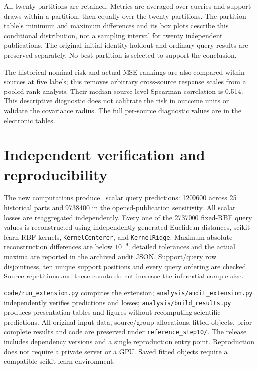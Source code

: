 All twenty partitions are retained. Metrics are averaged over queries and support draws within a partition, then equally over the twenty partitions. The partition table's minimum and maximum differences and its box plots describe this conditional distribution, not a sampling interval for twenty independent publications. The original initial identity holdout and ordinary-query results are preserved separately. No best partition is selected to support the conclusion.

\begin{table}[htbp]\centering\small
\caption{Twenty additional identity-disjoint partitions at five labels, using the same fixed historical-selected RBF. MAE and differences from matched random acquisition are in percentage points.}
\end{table}


The historical nominal risk and actual MSE rankings are also compared within sources at five labels; this removes arbitrary cross-source response scales from a pooled rank analysis. Their median source-level Spearman correlation is 0.514. This descriptive diagnostic does not calibrate the risk in outcome units or validate the covariance radius. The full per-source diagnostic values are in the electronic tables.

\section{Independent verification and reproducibility}
The new computations produce \NewScalarCount\ scalar query predictions: 1209600 across 25 historical parts and 9738400 in the opened-publication sensitivity. All scalar losses are reaggregated independently. Every one of the 2737000 fixed-RBF query values is reconstructed using independently generated Euclidean distances, scikit-learn RBF kernels, \texttt{KernelCenterer}, and \texttt{KernelRidge}. Maximum absolute reconstruction differences are below $10^{-9}$; detailed tolerances and the actual maxima are reported in the archived audit JSON. Support/query row disjointness, ten unique support positions and every query ordering are checked. Source repetitions and these counts do not increase the inferential sample size.

\texttt{code/run\_extension.py} computes the extension; \texttt{analysis/audit\_extension.py} independently verifies predictions and losses; \texttt{analysis/build\_results.py} produces presentation tables and figures without recomputing scientific predictions. All original input data, source/group allocations, fitted objects, prior complete results and code are preserved under \texttt{reference\_step10/}. The release includes dependency versions and a single reproduction entry point. Reproduction does not require a private server or a GPU. Saved fitted objects require a compatible scikit-learn environment.


